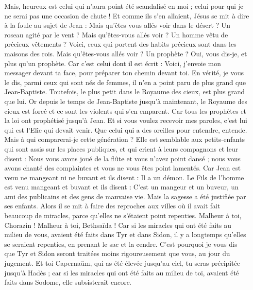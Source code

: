 \begin{multicols}{2}
Mais, heureux est celui qui n'aura point été scandalisé en moi ;
celui pour qui je ne serai pas une occasion de chute !
Et comme ils s'en allaient, Jésus se mit à dire à la foule au sujet de Jean : Mais qu'êtes-vous allés voir dans le désert ? Un roseau agité par le vent ?
Mais qu'êtes-vous allés voir ? Un homme vêtu de précieux vêtements ? Voici, ceux qui portent des habits précieux sont dans les maisons des rois.
Mais qu'êtes-vous allés voir ? Un prophète ? Oui, vous dis-je, et plus qu'un prophète.
Car c'est celui dont il est écrit : Voici, j'envoie mon messager devant ta face, pour préparer ton chemin devant toi.
En vérité, je vous le dis, parmi ceux qui sont nés de femmes, il n'en a point paru de plus grand que Jean-Baptiste. Toutefois, le plus petit dans le Royaume des cieux, est plus grand que lui.
Or depuis le temps de Jean-Baptiste jusqu'à maintenant, le Royaume des cieux est forcé et ce sont les violents qui s'en emparent.
Car tous les prophètes et la loi ont prophétisé jusqu'à Jean.
Et si vous voulez recevoir mes paroles, c'est lui qui est l'Elie qui devait venir.
Que celui qui a des oreilles pour entendre, entende.
Mais à qui comparerai-je cette génération ? Elle est semblable aux petits-enfants qui sont assis sur les places publiques, et qui crient à leurs compagnons
et leur disent : Nous vous avons joué de la flûte et vous n'avez point dansé ; nous vous avons chanté des complaintes et vous ne vous êtes point lamentés.
Car Jean est venu ne mangeant ni ne buvant et ils disent : Il a un démon.
Le Fils de l'homme est venu mangeant et buvant et ils disent : C'est un mangeur et un buveur, un ami des publicains et des gens de mauvaise vie. Mais la sagesse a été justifiée par ses enfants.
Alors il se mit à faire des reproches aux villes où il avait fait beaucoup de miracles, parce qu'elles ne s'étaient point repenties.
Malheur à toi, Chorazin ! Malheur à toi, Bethsaïda ! Car si les miracles qui ont été faits au milieu de vous, avaient été faits dans Tyr et dans Sidon, il y a longtemps qu'elles se seraient repenties, en prenant le sac et la cendre.
C'est pourquoi je vous dis que Tyr et Sidon seront traitées moins rigoureusement que vous, au jour du jugement.
Et toi Capernaüm, qui as été élevée jusqu'au ciel, tu seras précipitée jusqu'à Hadès ; car si les miracles qui ont été faits au milieu de toi, avaient été faits dans Sodome, elle subsisterait encore.

\end{multicols}
